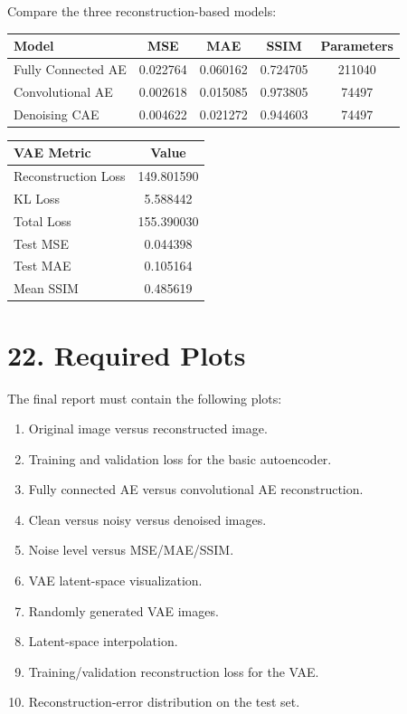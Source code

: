 \documentclass[10pt]{article}
\begin{document}
Compare the three reconstruction-based models:
\begin{center}
\begin{tabular}{|l|c|c|c|c|}
\hline
\textbf{Model} & \textbf{MSE} & \textbf{MAE} & \textbf{SSIM} & \textbf{Parameters}\\
\hline
Fully Connected AE & 0.022764 & 0.060162 & 0.724705 & 211040\\
Convolutional AE & 0.002618 & 0.015085 & 0.973805 & 74497\\
Denoising CAE & 0.004622 & 0.021272 & 0.944603 & 74497\\
\hline
\end{tabular}
\end{center}

\begin{center}
\begin{tabular}{|l|c|}
\hline
\textbf{VAE Metric} & \textbf{Value}\\
\hline
Reconstruction Loss & 149.801590\\
KL Loss & 5.588442\\
Total Loss & 155.390030\\
Test MSE & 0.044398\\
Test MAE & 0.105164\\
Mean SSIM & 0.485619\\
\hline
\end{tabular}
\end{center}

\section*{22. Required Plots}

The final report must contain the following plots:

\begin{enumerate}
\item Original image versus reconstructed image.
\item Training and validation loss for the basic autoencoder.
\item Fully connected AE versus convolutional AE reconstruction.
\item Clean versus noisy versus denoised images.
\item Noise level versus MSE/MAE/SSIM.
\item VAE latent-space visualization.
\item Randomly generated VAE images.
\item Latent-space interpolation.
\item Training/validation reconstruction loss for the VAE.
\item Reconstruction-error distribution on the test set.
\end{enumerate}
\end{document}
